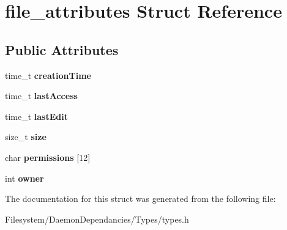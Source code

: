 \hypertarget{structfile__attributes}{}\section{file\+\_\+attributes Struct Reference}
\label{structfile__attributes}
\subsection*{Public Attributes}
\begin{DoxyCompactItemize}
\item 
time\+\_\+t {\bfseries creation\+Time}\hypertarget{structfile__attributes_a9fa92e6a7d6ac7f18df7940697524411}{}\label{structfile__attributes_a9fa92e6a7d6ac7f18df7940697524411}

\item 
time\+\_\+t {\bfseries last\+Access}\hypertarget{structfile__attributes_a9b16144fd6ce8d982afc738058f07fa3}{}\label{structfile__attributes_a9b16144fd6ce8d982afc738058f07fa3}

\item 
time\+\_\+t {\bfseries last\+Edit}\hypertarget{structfile__attributes_ad4592775c8cb9a899a12ca551329a936}{}\label{structfile__attributes_ad4592775c8cb9a899a12ca551329a936}

\item 
size\+\_\+t {\bfseries size}\hypertarget{structfile__attributes_a753691702c194d2e43c0fb62e6cd4ee1}{}\label{structfile__attributes_a753691702c194d2e43c0fb62e6cd4ee1}

\item 
char {\bfseries permissions} \mbox{[}12\mbox{]}\hypertarget{structfile__attributes_a6af710c43bfc31b1a005c9ad7251f801}{}\label{structfile__attributes_a6af710c43bfc31b1a005c9ad7251f801}

\item 
int {\bfseries owner}\hypertarget{structfile__attributes_a74be4a864fa3f38eff632b4b25654b97}{}\label{structfile__attributes_a74be4a864fa3f38eff632b4b25654b97}

\end{DoxyCompactItemize}


The documentation for this struct was generated from the following file\+:\begin{DoxyCompactItemize}
\item 
Filesystem/\+Daemon\+Dependancies/\+Types/types.\+h\end{DoxyCompactItemize}
